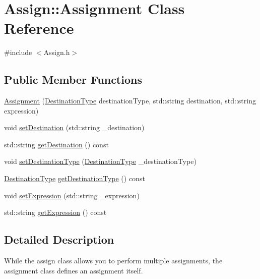 \hypertarget{class_assign_1_1_assignment}{}\section{Assign\+:\+:Assignment Class Reference}
\label{class_assign_1_1_assignment}


{\ttfamily \#include $<$Assign.\+h$>$}

\subsection*{Public Member Functions}
\begin{DoxyCompactItemize}
\item 
\hyperlink{class_assign_1_1_assignment_a41583f4bbce99b1d95f4ef067c236f7a}{Assignment} (\hyperlink{class_assign_a6145dc21d25f0d4b222e2474cbeeed98}{Destination\+Type} destination\+Type, std\+::string destination, std\+::string expression)
\item 
void \hyperlink{class_assign_1_1_assignment_a8d0c9b18c0b1258bba905b4e47a2659b}{set\+Destination} (std\+::string \+\_\+destination)
\item 
std\+::string \hyperlink{class_assign_1_1_assignment_a6cf7ecd2950dfc709985a1ede3773be8}{get\+Destination} () const 
\item 
void \hyperlink{class_assign_1_1_assignment_a9688ea3171c85ccbcdf0ed9d87ad9cc7}{set\+Destination\+Type} (\hyperlink{class_assign_a6145dc21d25f0d4b222e2474cbeeed98}{Destination\+Type} \+\_\+destination\+Type)
\item 
\hyperlink{class_assign_a6145dc21d25f0d4b222e2474cbeeed98}{Destination\+Type} \hyperlink{class_assign_1_1_assignment_a46493b98c1cd97ce4b015640bf34dd27}{get\+Destination\+Type} () const 
\item 
void \hyperlink{class_assign_1_1_assignment_aa36ca609362d3deedffbefd9cceb12e6}{set\+Expression} (std\+::string \+\_\+expression)
\item 
std\+::string \hyperlink{class_assign_1_1_assignment_a724dc03a686c4d53d57ee45b7617ae2f}{get\+Expression} () const 
\end{DoxyCompactItemize}


\subsection{Detailed Description}
While the assign class allows you to perform multiple assignments, the assignment class defines an assignment itself. 

